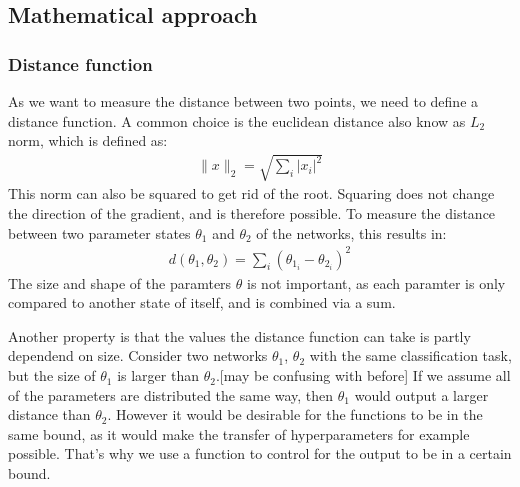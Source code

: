 \subsection{Mathematical approach}\label{sub:Mathematical_approach}
\subsubsection{Distance function}\label{distance_function}
As we want to measure the distance between two points, we need to define a
distance function. A common choice is the euclidean distance also know as $L_2$
norm, which is defined as: 
\begin{align}
    \rVert x \lVert_2 = \sqrt{\sum_i \lvert x_i \rvert^2}
\end{align}
This norm can also be squared to get rid of the root. Squaring does not change
the direction of the gradient, and is therefore possible. To measure the
distance between two parameter states $\theta_1$ and $\theta_2$ of the networks,
this results in:
\begin{align}\label{eq:distance}
    d(\theta_1, \theta_2)= \sum_i (\theta_{1_i}-\theta_{2_i})^2
\end{align}
The size and shape of the paramters $\theta$ is not important, as each paramter
is only compared to another state of itself, and is combined via a sum.

Another property is that the values the distance function can take is partly
dependend on size. Consider two networks $\theta_1$, $\theta_2$ with the same
classification task, but the size of $\theta_1$ is larger than $\theta_2$.[may
be confusing with before] If we assume all of the parameters are distributed the
same way, then $\theta_1$ would output a larger distance than $\theta_2$.
However it would be desirable for the functions to be in the same bound, as it
would make the transfer of hyperparameters for example possible. That's why we
use a function to control for the output to be in a certain bound.

